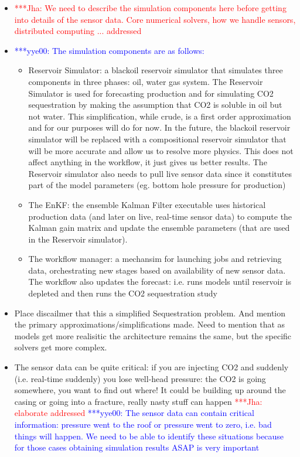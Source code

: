 \documentclass[conference,draft]{IEEEtran}
\newcommand{\jhanote}[1]{ {\textcolor{red} { ***Jha: #1 }}}
\newcommand{\yyenote}[1]{ {\textcolor{blue} { ***yye00: #1 }}}
\newcommand{\jhanote}[1]{}
\newcommand{\yyenote}[1]{}
\begin{document}
\begin{itemize}
\item \jhanote{We need to describe the simulation components here before getting into details of
   the sensor data. Core numerical solvers, how we handle sensors, distributed computing ... addressed}
\item \yyenote{ The simulation components are as follows:}
  \begin{itemize}
    \item Reservoir Simulator: a blackoil reservoir simulator that simulates three components in three phases: oil, water gas system. The Reservoir Simulator is used for forecasting production and for simulating CO2 sequestration by making the assumption that CO2 is soluble in oil but not water. This simplification, while crude, is a first order approximation and for our purposes will do for now. In the future, the blackoil reservoir simulator will be replaced with a compositional reservoir simulator that will be more accurate and allow us to resolve more physics. This does not affect anything in the workflow, it just gives us better results. The Reservoir simulator also needs to pull live sensor data since it constitutes part of the model parameters (eg. bottom hole pressure for production)
    \item The EnKF: the ensemble Kalman Filter executable uses historical production data (and later on live, real-time sensor data) to compute the Kalman gain matrix and update the ensemble parameters (that are used in the Reservoir simulator).
    \item The workflow manager: a mechansim for launching jobs and retrieving data, orchestrating new stages based on availability of new sensor data. The workflow also updates the forecast: i.e. runs models until reservoir is depleted and then runs the CO2 sequestration study
  \end{itemize}


\item Place discailmer that this a simplified Sequestration problem. And mention the primary
 approximations/simplifications made. Need to mention that as models get more realisitic the
architecture remains the same, but the specific solvers get more complex.

\item The sensor data can be quite critical: if you are injecting CO2 and suddenly (i.e. real-time suddenly) you lose well-head pressure: the CO2 is going somewhere, you want to find out where! It could be building up around the casing or going into a fracture, really nasty stuff can happen \jhanote{elaborate  addressed} \yyenote{The sensor data can contain critical information: pressure went to the roof or pressure went to zero, i.e. bad things will happen. We need to be able to identify these situations because for those cases obtaining simulation results ASAP is very important}


\end{itemize}
\end{document}
